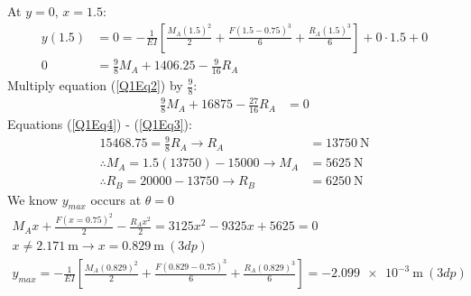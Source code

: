 \documentclass[11pt]{article}
\numberwithin{equation}{section}
\begin{document}
At $y =0$, $x=1.5$:
\begin{align}
  y(1.5) &= 0 = -\frac{1}{EI} \left[ \frac{M_A(1.5)^2}{2} + \frac{F(1.5-0.75)^3}{6} + \frac{R_A (1.5)^3}{6} \right] + 0\cdot 1.5 + 0\\
  0 &= \frac{9}{8}M_A + 1406.25 - \frac{9}{16}R_A \label{Q1Eq3}
\end{align}
Multiply equation (\ref{Q1Eq2}) by $\frac{9}{8}$:
\begin{align}
  \frac{9}{8} M_A + 16875 - \frac{27}{16} R_A &= 0 \label{Q1Eq4}
\end{align}
Equations (\ref{Q1Eq4}) - (\ref{Q1Eq3}):
\begin{align}
  15468.75 = \frac{9}{8}R_A \rightarrow R_A &= \SI{13750}{\newton}\\
  \therefore M_A = 1.5(13750) - 15000 \rightarrow M_A &= \SI{5625}{\newton}\\
  \therefore R_B = 20000-13750 \rightarrow R_B &= \SI{6250}{\newton}
\end{align}
We know $y_{max}$ occurs at $\theta = 0$
\begin{gather}
  M_A x + \frac{F(x=0.75)^2}{2} - \frac{R_A x^2}{2} = 3125x^2 -9325x + 5625 = 0\\
  x\neq\SI{2.171}{\metre} \rightarrow x = \SI{0.829}{\metre} \ (3dp)\\
  y_{max} = -\frac{1}{EI} \left[ \frac{M_A(0.829)^2}{2} + \frac{F(0.829-0.75)^3}{6} + \frac{R_A (0.829)^3}{6} \right] = \SI{-2.099e-3}{\metre} \ (3dp)
\end{gather}
\end{document}
